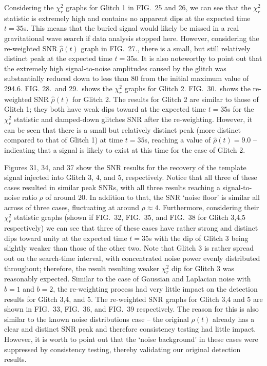 \documentclass[preprint,
letterpaper,
 amsmath,amssymb,
 aps,
]{revtex4-2}
\begin{document}
Considering the $\chi^2_r$ graphs for Glitch 1 in FIG.\ 25 and 26, we can see that the $\chi^2_r$ statistic is extremely high and contains no apparent dips at the expected time $t=35$s. This means that the buried signal would likely be missed in a real gravitational wave search if data analysis stopped here. However, considering the re-weighted SNR $\hat{\rho}(t)$ graph in FIG.\ 27., there is a small, but still relatively distinct peak at the expected time $t=35$s. It is also noteworthy to point out that the extremely high signal-to-noise amplitudes caused by the glitch was substantially reduced down to less than 80 from the initial maximum value of 294.6.  FIG. 28.\ and 29.\ shows the  $\chi^2_r$ graphs for Glitch 2. FIG.\ 30.\ shows the re-weighted SNR $\hat{\rho}(t)$ for Glitch 2. The results for Glitch 2 are similar to those of Glitch 1; they both have weak dips toward at the expected time $t=35$s for the $\chi_r^2$ statistic and damped-down glitches SNR after the re-weighting. However, it can be seen that there is a small but relatively distinct peak (more distinct compared to that of Glitch 1) at time $t=35$s, reaching a value of $\hat{\rho}(t)=9.0$ – indicating that a signal is likely to exist at this time for the case of Glitch 2.

Figures 31, 34, and 37 show the SNR results for the recovery of the template signal injected into Glitch 3, 4, and 5, respectively. Notice that all three of these cases resulted in similar peak SNRs, with all three results reaching a signal-to-noise ratio $\rho$ of around $20$. In addition to that, the SNR `noise floor' is similar all across of three cases, fluctuating at around $\rho\approx 4$. Furthermore, considering their $\chi_r^2$ statistic graphs (shown if FIG.\ 32, FIG.\ 35, and FIG.\ 38 for Glitch 3,4,5 respectively) we can see that three of these cases have rather strong and distinct dips toward unity at the expected time $t=35$s with the dip of Glitch 3 being slightly weaker than those of the other two. Note that Glitch 3 is rather spread out on the search-time interval, with concentrated noise power evenly distributed throughout; therefore, the result resulting weaker $\chi_r^2$ dip for Glitch 3 was reasonably expected. Similar to the case of Gaussian and Laplacian noise with $b=1$ and $b=2$, the re-weighting process had very little impact on the detection results for Glitch 3,4, and 5. The re-weighted SNR graphs for Glitch 3,4 and 5 are shown in FIG.\ 33, FIG.\ 36, and FIG.\ 39 respectively. The reason for this is also similar to the known noise distributions case – the original $\rho(t)$ already has a clear and distinct SNR peak and therefore consistency testing had little impact. However, it is worth to point out that the `noise background' in these cases were suppressed by consistency testing, thereby validating our original detection results.  
\end{document}

